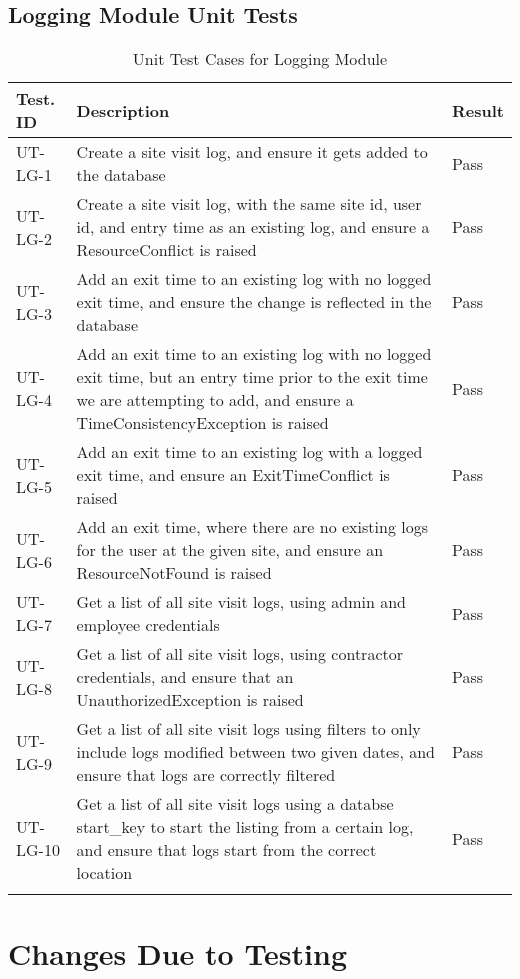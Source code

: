 \documentclass[12pt, titlepage]{article}
\begin{document}
\subsection{Logging Module Unit Tests}

\begin{longtable}{|m{2cm}|m{10cm}|m{1.4cm}|}
  \hline
  \textbf{Test. ID} & \textbf{Description} & \textbf{Result} \\ \hline
  UT-LG-1 & Create a site visit log, and ensure it gets added to the
  database & Pass\\ \hline
  UT-LG-2 & Create a site visit log, with the same site id, user id,
  and entry time as an existing log, and ensure a ResourceConflict is
  raised & Pass\\ \hline
  UT-LG-3 & Add an exit time to an existing log with no logged exit
  time, and ensure the change is reflected in the database & Pass\\ \hline
  UT-LG-4 & Add an exit time to an existing log with no logged exit
  time, but an entry time prior to the exit time we are attempting to
  add, and ensure a TimeConsistencyException is raised & Pass\\ \hline
  UT-LG-5 & Add an exit time to an existing log with a logged exit
  time, and ensure an ExitTimeConflict is raised & Pass\\ \hline
  UT-LG-6 & Add an exit time, where there are no existing logs for
  the user at the given site, and ensure an ResourceNotFound is
  raised & Pass\\ \hline
  UT-LG-7 & Get a list of all site visit logs, using admin and
  employee credentials & Pass\\ \hline
  UT-LG-8 & Get a list of all site visit logs, using contractor
  credentials, and ensure that an UnauthorizedException is raised &
  Pass\\ \hline
  UT-LG-9 & Get a list of all site visit logs using filters to only
  include logs modified between two given dates, and ensure that logs
  are correctly filtered & Pass\\ \hline
  UT-LG-10 & Get a list of all site visit logs using a databse
  start\_key to start the listing from a certain log, and ensure that
  logs start from the correct location & Pass\\ \hline
  \caption{Unit Test Cases for Logging Module}
\end{longtable}

\section{Changes Due to Testing}
\end{document}
